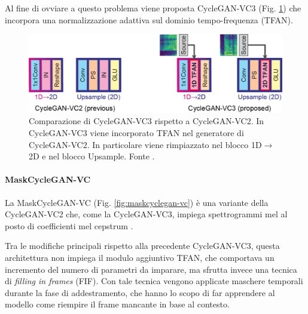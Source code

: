 			Al fine di ovviare a questo problema viene proposta CycleGAN-VC3 (Fig. \ref{fig:cyclegan-vc3}) che incorpora una normalizzazione adattiva sul dominio tempo-frequenza (TFAN)\cite{CycleGAN-VC3}.
			\begin{figure}[h]
				\centering
				\includegraphics[width=0.8\linewidth]{figures/CycleGAN-VC3}
				\caption{Comparazione di CycleGAN-VC3 rispetto a CycleGAN-VC2. In CycleGAN-VC3 viene incorporato TFAN nel generatore di CycleGAN-VC2. In particolare viene rimpiazzato nel blocco 1D$\rightarrow$2D e nel blocco Upsample. Fonte \cite{CycleGAN-VC3}.}
				\label{fig:cyclegan-vc3}
			\end{figure}
		
			\paragraph{MaskCycleGAN-VC}
			La MaskCycleGAN-VC (Fig. \ref{fig:maskcyclegan-vc}) è una variante della CycleGAN-VC2 che, come la CycleGAN-VC3, impiega spettrogrammi mel al posto di coefficienti mel cepstrum \cite{MaskCyclegan-VC}.
			
			Tra le modifiche principali rispetto alla precedente CycleGAN-VC3, questa architettura non impiega il modulo aggiuntivo TFAN, che comportava un incremento del numero di parametri da imparare, ma sfrutta invece una tecnica di \textit{filling in frames} (FIF).
			Con tale tecnica vengono applicate maschere temporali durante la fase di addestramento, che hanno lo scopo di far apprendere al modello come riempire il frame mancante in base al contesto.
			
